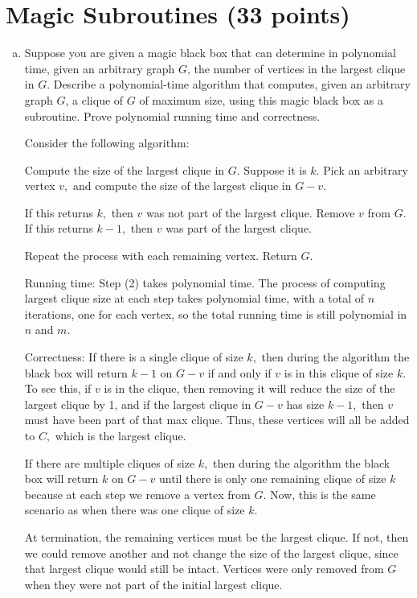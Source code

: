 \documentclass{article}
\begin{document}
\section{Magic Subroutines (33 points)}
\begin{enumerate}[(a)]
	\item Suppose you are given a magic black box that can determine in polynomial time, given an arbitrary graph $G$, the number of vertices in the largest clique in $G$. Describe a polynomial-time algorithm that computes, given an arbitrary graph $G$, a clique of $G$ of maximum size, using this magic black box as a subroutine.  Prove polynomial running time and correctness.  
		\begin{soln}
			Consider the following algorithm:
			\begin{enumerate}[(1)]
				\ii Compute the size of the largest clique in $G.$ Suppose it is $k.$
				\ii Pick an arbitrary vertex $v,$ and compute the size of the largest clique in $G-v.$
				\begin{enumerate}[(a)]
					\ii If this returns $k,$ then $v$ was not part of the largest clique. Remove $v$ from $G.$
					\ii If this returns $k-1,$ then $v$ was part of the largest clique.
				\end{enumerate}
				\ii Repeat the process with each remaining vertex.
				\ii Return $G.$
			\end{enumerate}

			Running time: Step (2) takes polynomial time. The process of computing largest clique size at each step takes polynomial time, with a total of $n$ iterations, one for each vertex, so the total running time is still polynomial in $n$ and $m.$

			Correctness:  If there is a single clique of size $k,$ then during the algorithm the black box will return $k-1$ on $G-v$ if and only if $v$ is in this clique of size $k.$ To see this, if $v$ is in the clique, then removing it will reduce the size of the largest clique by 1, and if the largest clique in $G-v$ has size $k-1,$ then $v$ must have been part of that max clique. Thus, these vertices will all be added to $C,$ which is the largest clique.

			If there are multiple cliques of size $k,$ then during the algorithm the black box will return $k$ on $G-v$ until there is only one remaining clique of size $k$ because at each step we remove a vertex from $G.$ Now, this is the same scenario as when there was one clique of size $k.$

			At termination, the remaining vertices must be the largest clique. If not, then we could remove another and not change the size of the largest clique, since that largest clique would still be intact. Vertices were only removed from $G$ when they were not part of the initial largest clique.
		 \end{soln}


\end{enumerate}
\end{document}
